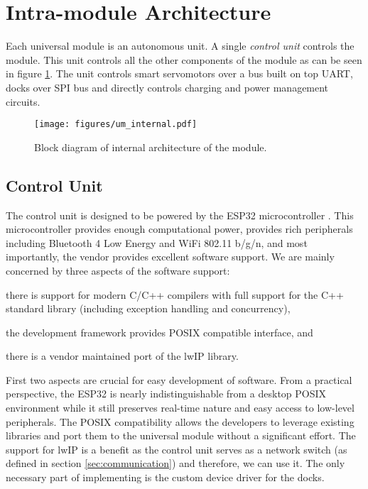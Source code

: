 \section{Intra-module Architecture}

Each universal module is an autonomous unit. A single \emph{control unit}
controls the module. This unit controls all the other components of the module
as can be seen in figure \ref{fig:um_internal}. The unit controls smart
servomotors over a bus built on top UART, docks over SPI bus and directly
controls charging and power management circuits.

\begin{figure}[!t]
    \centering
    \texttt{[image: figures/um\_internal.pdf]}
    \caption{Block diagram of internal architecture of the module.}
    \label{fig:um_internal}
\end{figure}

\subsection{Control Unit}

The control unit is designed to be powered by the ESP32 microcontroller
\cite{noauthor_esp32_2018}. This microcontroller provides enough computational
power, provides rich peripherals including Bluetooth 4 Low Energy and WiFi
802.11 b/g/n, and most importantly, the vendor provides excellent software
support. We are mainly concerned by three aspects of the software support:
\begin{enumerate*}
    \item there is support for modern C/C++ compilers with full support for the
    C++ standard library (including exception handling and concurrency),
    \item the development framework provides POSIX compatible interface, and
    \item there is a vendor maintained port of the lwIP library.
\end{enumerate*}

First two aspects are crucial for easy development of software. From a practical
perspective, the ESP32 is nearly indistinguishable from a desktop POSIX
environment while it still preserves real-time nature and easy access to
low-level peripherals. The POSIX compatibility allows the developers to leverage
existing libraries and port them to the universal module without a significant
effort. The support for lwIP is a benefit as the control unit serves as a
network switch (as defined in section \ref{sec:communication}) and therefore, we
can use it. The only necessary part of implementing is the custom device driver
for the docks.

